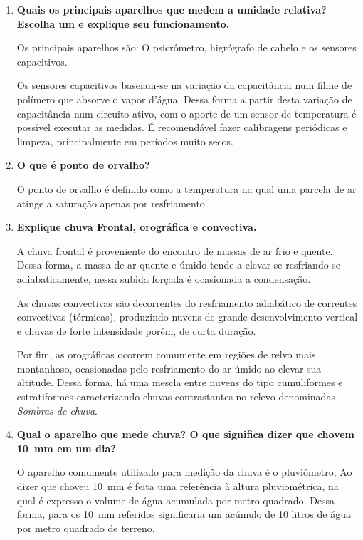 \documentclass[a4paper, 12pt]{article}
\newcommand{\tbf}[1]{\textbf{#1}}
\begin{document}
\begin{enumerate}
		\item\tbf{Quais os principais aparelhos que medem a umidade relativa? Escolha um e explique seu funcionamento.}
		
		Os principais aparelhos são: O psicrômetro, higrógrafo de cabelo e os sensores capacitivos.
		
		Os sensores capacitivos baseiam-se na variação da capacitância num filme de polímero que absorve o vapor d'água. Dessa forma a partir desta variação de capacitância num circuito ativo, com o aporte de um sensor de temperatura é possível executar as medidas. É recomendável fazer calibragens periódicas e limpeza, principalmente em períodos muito secos.
		
		\item\tbf{O que é ponto de orvalho?}
		
		O ponto de orvalho é definido como a temperatura na qual uma parcela de ar atinge a saturação apenas por resfriamento.
		
		\item\tbf{Explique chuva Frontal, orográfica e convectiva.}
		
		A chuva frontal é proveniente do encontro de massas de ar frio e quente. Dessa forma, a massa de ar quente e úmido tende a elevar-se resfriando-se adiabaticamente, nessa subida forçada é ocasionada a condensação.
		
		As chuvas convectivas são  decorrentes do resfriamento adiabático de correntes convectivas (térmicas), produzindo nuvens de grande desenvolvimento vertical e chuvas de forte intensidade porém, de curta duração.
		
		Por fim, as orográficas ocorrem comumente em regiões de relvo mais montanhoso, ocasionadas pelo resfriamento do ar úmido ao elevar sua altitude. Dessa forma, há uma mescla entre nuvens do tipo cumuliformes e estratiformes caracterizando chuvas contrastantes no relevo denominadas \textit{Sombras de chuva}.
		
		\item\tbf{Qual o aparelho que mede chuva? O que significa dizer que chovem \SI{10}{\milli\meter} em um dia?}
		
		O aparelho comumente utilizado para medição da chuva é o pluviômetro; Ao dizer que choveu \SI{10}{\milli\meter} é feita uma referência à altura pluviométrica, na qual é expresso o volume de água acumulada por metro quadrado. Dessa forma, para os \SI{10}{\milli\meter} referidos significaria um acúmulo de 10 litros de água por metro quadrado de terreno.
		

\end{enumerate}
\end{document}
